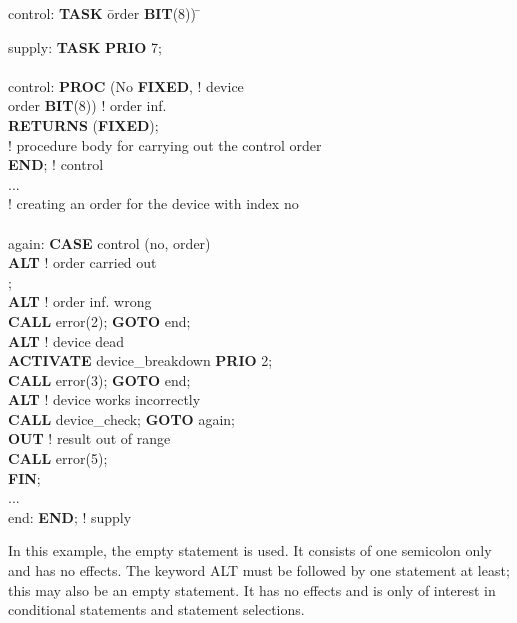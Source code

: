 \begin{tabbing}

control: \= {\bf TASK} \= order {\bf BIT}(8)) \x \= \kill

supply:  \> {\bf TASK} \> {\bf PRIO} 7;       \> \\
 \> \> \> \\
control: \> {\bf PROC} \> (No {\bf FIXED},    \> ! device \\
 \>             \> order {\bf BIT}(8)) \> ! order inf.\\
 \> {\bf RETURNS} ({\bf FIXED});   \>  \> \\
 \> ! procedure body for carrying out the control order \> \> \\
 \> {\bf END}; ! control \> \> \\
 \> ... \> \> \\
 \> ! creating an order for the device with index no \> \> \\
 \> \> \> \\
again:   \> {\bf CASE} \> control (no, order) \> \\
 \> {\bf ALT}   \> ! order carried out \> \\
 \>             \> ; \> \\
 \> {\bf ALT}   \> ! order inf. wrong \> \\
 \>             \> {\bf CALL} error(2); {\bf GOTO} end; \> \\
 \> {\bf ALT}   \> ! device dead \> \\
 \>             \> {\bf ACTIVATE} device\_breakdown {\bf PRIO} 2; \> \\
 \>             \> {\bf CALL} error(3); {\bf GOTO} end; \> \\
 \> {\bf ALT}   \> ! device works incorrectly \> \\
 \>             \> {\bf CALL} device\_check; {\bf GOTO} again; \> \\
 \> {\bf OUT}   \> ! result out of range \> \\
 \>             \> {\bf CALL} error(5); \> \\
 \> {\bf FIN}; \> \> \\
 \> ...         \> \> \\
end:     \> {\bf END}; \> ! supply \>
\end{tabbing}

In this example, the empty statement is used. It consists of one
semicolon only and has no effects. The keyword ALT must be followed by
one statement at least; this may also be an empty statement. It has no
effects and is only of interest in conditional statements and statement
selections.

